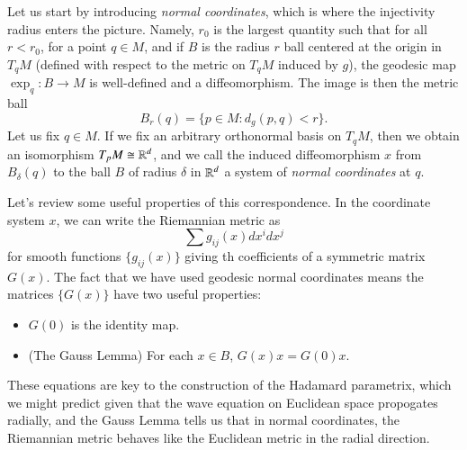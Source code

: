 Let us start by introducing \emph{normal coordinates}, which is where the injectivity radius enters the picture. Namely, $r_0$ is the largest quantity such that for all $r < r_0$, for a point $q \in M$, and if $B$ is the radius $r$ ball centered at the origin in $T_{q} M$ (defined with respect to the metric on $T_{q} M$ induced by $g$), the geodesic map $\exp_{q}: B \to M$ is well-defined and a diffeomorphism. The image is then the metric ball
%
\[ B_r(q) = \{ p \in M: d_g(p,q) < r \}. \]
%
Let us fix $q \in M$. If we fix an arbitrary orthonormal basis on $T_{q} M$, then we obtain an isomorphism $T_p M \cong \operatorname{\mathbb{R}}^d$, and we call the induced diffeomorphism $x$ from $B_\delta(q)$ to the ball $B$ of radius $\delta$ in $\operatorname{\mathbb{R}}^d$ a system of \emph{normal coordinates} at $q$.

Let's review some useful properties of this correspondence. In the coordinate system $x$, we can write the Riemannian metric as
%
\[ \sum g_{ij}(x) dx^i dx^j \]
%
for smooth functions $\{ g_{ij}(x) \}$ giving th coefficients of a symmetric matrix $G(x)$. The fact that we have used geodesic normal coordinates means the matrices $\{ G(x) \}$ have two useful properties:
%
%
%
%
\begin{itemize}
    \item $G(0)$ is the identity map.

    \item (The Gauss Lemma) For each $x \in B$, $G(x) x = G(0) x$.
\end{itemize}
%
These equations are key to the construction of the Hadamard parametrix, which we might predict given that the wave equation on Euclidean space propogates radially, and the Gauss Lemma tells us that in normal coordinates, the Riemannian metric behaves like the Euclidean metric in the radial direction.

